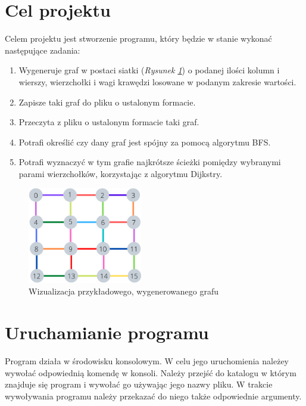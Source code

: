 \documentclass{article}
\begin{document}
\section{Cel projektu}
Celem projektu jest stworzenie programu, który będzie w stanie wykonać następujące zadania:
\begin{enumerate}
    \item Wygeneruje graf w postaci siatki (\emph{Rysunek \ref{fig:graf_pp}}) o podanej ilości kolumn i wierszy, wierzchołki i wagi krawędzi losowane w podanym zakresie wartości.
    \item Zapisze taki graf do pliku o ustalonym formacie.
    \item Przeczyta z pliku o ustalonym formacie taki graf.
    \item Potrafi określić czy dany graf jest spójny za pomocą algorytmu BFS.
    \item Potrafi wyznaczyć w tym grafie najkrótsze ścieżki pomiędzy wybranymi parami wierzchołków, korzystając z algorytmu Dijkstry.
\end{enumerate}

\begin{figure}[htp]
        \centering
        \includegraphics[width=5cm]{images/graf_pp.png}
        \caption{Wizualizacja przykładowego, wygenerowanego grafu}
        \label{fig:graf_pp}
\end{figure}

\newpage

\section{Uruchamianie programu}
Program działa w środowisku konsolowym. W celu jego uruchomienia należey wywołać odpowiednią komendę w konsoli. Należy przejść do katalogu w którym znajduje się program i wywołać go używając jego nazwy pliku. W trakcie wywoływania programu należy przekazać do niego także odpowiednie argumenty.
\end{document}
